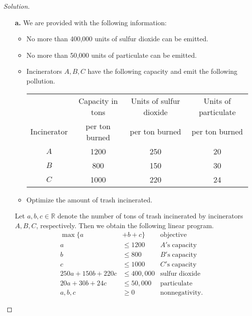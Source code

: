 \documentclass[ 12pt ]{article}
\begin{document}
\begin{enumerate}
		\begin{proof}[Solution] $ $
			\begin{enumerate}
				\item[\textbf{a.}] We are provided with the following information:
					\begin{itemize}
						\item No more than 400,000 units of sulfur dioxide can be emitted.
						\item No more than 50,000 units of particulate can be emitted.
						\item Incinerators $A, B, C$ have the following capacity and emit the following pollution.
							\begin{center}
							\begin{tabular}{c|ccc}
								 & Capacity in tons & Units of sulfur dioxide & Units of particulate \\
								Incinerator & per ton burned & per ton burned & per ton burned \\
								\hline
								$A$ & 1200 & 250 & 20 \\
								$B$ & 800 & 150 & 30 \\
								$C$ & 1000 & 220 & 24
							\end{tabular}
							\end{center}
						\item Optimize the amount of trash incinerated.
					\end{itemize}
					Let $a, b, c \in \mathbb{R}$ denote the number of tons of trash incinerated by incinerators $A, B, C$, respectively. Then we obtain the following linear program.
					\begin{align*}
						\max \{ a &+ b + c \}  &\mathrm{objective} \\
						a &\leq 1200 &A \mathrm{'s\; capacity} \\
						b &\leq 800 &B \mathrm{'s\; capacity} \\
						c &\leq 1000 &C \mathrm{'s\; capacity} \\
						250a + 150b + 220c &\leq 400,000 &\mathrm{sulfur\; dioxide} \\
						20a + 30b + 24c &\leq 50,000 &\mathrm{particulate} \\
						a, b, c &\geq 0 &\mathrm{nonnegativity}.
					\end{align*}


\end{enumerate}
\end{proof}
\end{enumerate}
\end{document}
